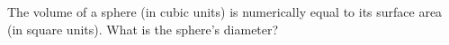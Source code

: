 The volume of a sphere (in cubic units) is numerically equal to its surface area (in square units). What is the sphere's diameter?
